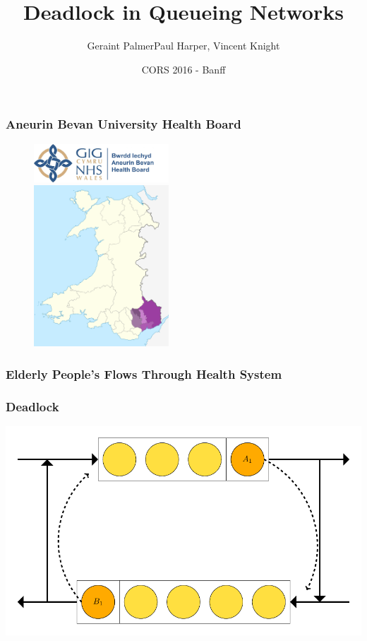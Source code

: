 \documentclass[xcolor={table}]{beamer}
\title{Deadlock in Queueing Networks}
\author{Geraint Palmer\newline \scriptsize{Paul Harper, Vincent Knight}}
\date{CORS 2016 - Banff}
\begin{document}
\frame{\titlepage}


\begin{frame}
\frametitle{Aneurin Bevan University Health Board}
\begin{figure}
\includegraphics[width=0.45\textwidth]{img/ABUHBlogo}\\
\includegraphics[width=0.45\textwidth]{img/Aneurin_Bevan_all_Wales}
\end{figure}
\end{frame}

\begin{frame}
\frametitle{Elderly People's Flows Through Health System}
\begin{figure}

\end{figure}
\end{frame}

\begin{frame}
  \frametitle{Deadlock}
    \begin{figure}
    
    \end{figure}
\end{frame}

\begin{frame}

\end{frame}

\begin{frame}
\includegraphics[width=\textwidth]{img/2nodesindeadlock.pdf}
\end{frame}
\end{document}
